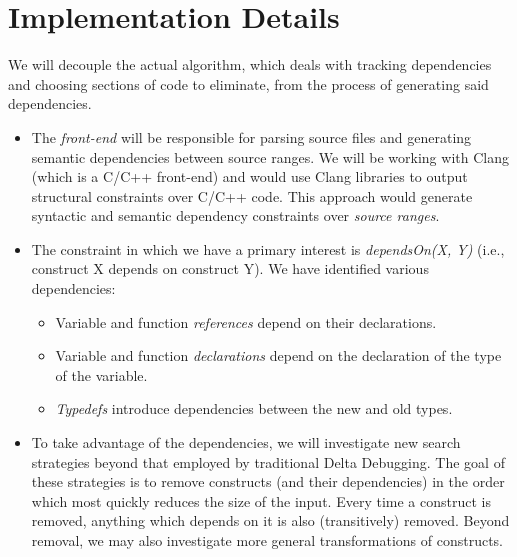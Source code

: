 \documentclass[11pt]{article}
\begin{document}
\section{Implementation Details}
We will decouple the actual algorithm, which deals with tracking dependencies
and choosing sections of code to eliminate, from the process of generating said
dependencies.

\begin{itemize}
\item The \emph{front-end} will be responsible for parsing source files and
  generating semantic dependencies between source ranges. We will be working
  with Clang (which is a C/C++ front-end) and would use Clang libraries to
  output structural constraints over C/C++ code.  This approach would generate
  syntactic and semantic dependency constraints over \emph{source ranges}.

\item The constraint in which we have a primary interest is \emph{dependsOn(X,
  Y)} (i.e., construct X depends on construct Y).  We have identified various
  dependencies:

\begin{itemize}
\item{Variable and function \emph{references} depend on their declarations.}
\item{Variable and function \emph{declarations} depend on the declaration of the
type of the variable.}
\item{\emph{Typedefs} introduce dependencies between the new and old types.}
\end{itemize}

\item To take advantage of the dependencies, we will investigate new search
  strategies beyond that employed by traditional Delta Debugging.  The goal
  of these strategies is to remove constructs (and their dependencies) in the
  order which most quickly reduces the size of the input.
  Every time a construct is removed, anything which depends on
  it is also (transitively) removed.  Beyond removal, we may also investigate
  more general transformations of constructs.%


\end{itemize}
\end{document}
